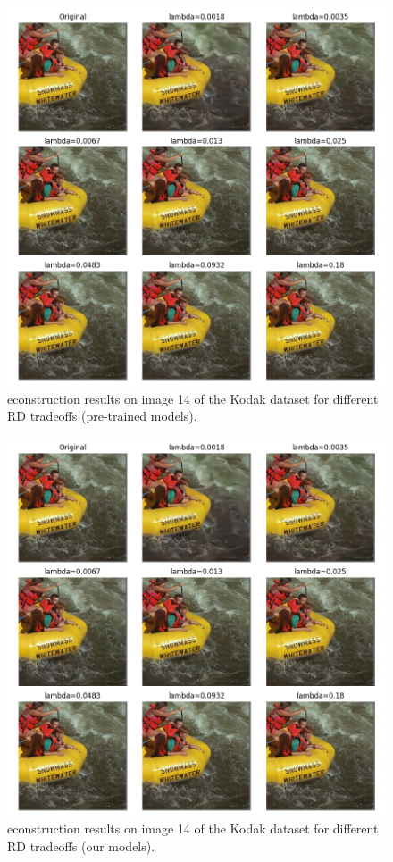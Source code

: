\begin{figure}
    \centering
    \includegraphics[width=15cm]{img/bdpsnr_kodak_14_pretrained.png}
    \caption[econstruction results on image 14 of the Kodak dataset for different RD tradeoffs (pre-trained models).]{econstruction results on image 14 of the Kodak dataset for different RD tradeoffs (pre-trained models).}
    \label{appendix:bdpsnr_1:a}
\end{figure}

\begin{figure}
    \centering
    \includegraphics[width=15cm]{img/bdpsnr_kodak_14.png}
    \caption[econstruction results on image 14 of the Kodak dataset for different RD tradeoffs (our models).]{econstruction results on image 14 of the Kodak dataset for different RD tradeoffs (our models).}
    \label{appendix:bdpsnr_1:b}
\end{figure}

